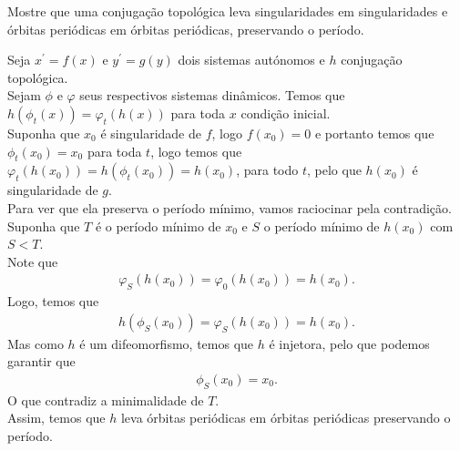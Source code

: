 \begin{homeworkProblem}[1-14]
  Mostre que uma conjugação topológica leva singularidades em singularidades e órbitas periódicas em órbitas periódicas, preservando o período.
  \begin{solution}
    Seja $x^{\prime}=f(x)$ e $y^{\prime}=g(y)$ dois sistemas autónomos e $h$ conjugação topológica.\\
    Sejam $\phi$ e $\varphi$ seus respectivos sistemas dinâmicos. Temos que $h(\phi_t(x))=\varphi_t(h(x))$ para toda $x$ condição inicial.\\
    Suponha que $x_0$ é singularidade de $f$, logo $f(x_0)=0$ e portanto temos que $\phi_t(x_0)=x_0$ para toda $t$, logo temos que $\varphi_t(h(x_0))=h(\phi_t(x_0))=h(x_0)$, para todo $t$, pelo que $h(x_0)$ é singularidade de $g$.\\
    Para ver que ela preserva o período mínimo, vamos raciocinar pela contradição. Suponha que $T$ é o período mínimo de $x_0$ e $S$ o período mínimo de $h(x_0)$ com $S<T$.\\
    Note que
    \begin{align*}
      \varphi_S(h(x_0))=\varphi_0(h(x_0))=h(x_0).
    \end{align*}
    Logo, temos que
    \begin{align*}
      h(\phi_S(x_0))=\varphi_S(h(x_0))=h(x_0).
    \end{align*}
    Mas como $h$ é um difeomorfismo, temos que $h$ é injetora, pelo que podemos garantir que
    \begin{align*}
      \phi_S(x_0)=x_0.
    \end{align*}
    O que contradiz a minimalidade de $T$.\\
    Assim, temos que $h$ leva órbitas periódicas em órbitas periódicas preservando o período. 
  \end{solution}
\end{homeworkProblem}

